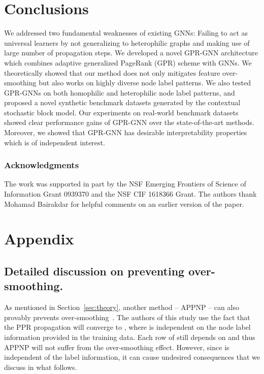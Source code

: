 \documentclass{article} \usepackage{iclr2021_conference,times}
\begin{document}
\section{Conclusions}
We addressed two fundamental weaknesses of existing GNNs: Failing to act as universal learners by not generalizing to heterophilic graphs and making use of large number of propagation steps. We developed a novel GPR-GNN architecture which combines adaptive generalized PageRank (GPR) scheme with GNNs. We theoretically showed that our method does not only mitigates feature over-smoothing but also works on highly diverse node label patterns. We also tested GPR-GNNs on both homophilic and heterophilic node label patterns, and proposed a novel synthetic benchmark datasets generated by the contextual stochastic block model. Our experiments on real-world benchmark datasets showed clear performance gains of GPR-GNN over the state-of-the-art methods. Moreover, we showed that GPR-GNN has desirable interpretability properties which is of independent interest.


\subsubsection*{Acknowledgments}
The work was supported in part by the NSF Emerging Frontiers of Science of Information Grant 0939370 and the NSF CIF 1618366 Grant. The authors thank Mohamad Bairakdar for helpful comments on an earlier version of the paper.






\newpage

\appendix
\section{Appendix}







\subsection{Detailed discussion on preventing over-smoothing. }
As mentioned in Section~\ref{sec:theory}, another method -- APPNP -- can also provably prevents over-smoothing~\citet{klicpera2018predict}. The authors of this study use the fact that the PPR propagation will converge to , where  is independent on the node label information provided in the  training data. Each row of  still depends on  and thus APPNP will not suffer from the over-smoothing effect. However, since  is independent of the label information, it can cause undesired consequences that we discuss in what follows.
\end{document}
